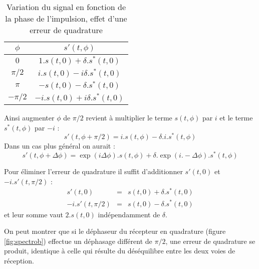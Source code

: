\begin{table}
\caption{Variation du signal en fonction de la phase de l'impulsion, 
effet d'une erreur de quadrature}
\label{tab:phaseb}
\begin{center}
\begin{tabular}[hbt]{cc}
\hline
$\phi$    &                      $s'(t,\phi)$           \\ \hline
$0$      &  $1.s(t,0)  + \delta.s^*(t,0)$ \\
$\pi/2$  &  $i.s(t,0) -i \delta.s^*(t,0)$ \\
$\pi$    &   $-s(t,0)  - \delta.s^*(t,0)$ \\
$-\pi/2$ & $-i.s(t,0) +i \delta.s^*(t,0)$ \\
\hline
\end{tabular}
\end{center}  
\end{table}


Ainsi augmenter $\phi$ de $\pi/2$ revient à multiplier le terme $s(t,\phi)$ par $i$ 
et le terme $s^*(t,\phi)$ par $-i$ : 
\begin{equation}
s'(t,\phi+\pi/2) = i . s(t,\phi) - \delta . i . s^*(t,\phi)
\end{equation}
Dans un cas plus général on aurait :
\begin{equation}
s'(t,\phi+\Delta \phi) = \exp(i \Delta \phi) . s(t,\phi) + 
\delta.\exp(i.-\Delta \phi) . s^*(t,\phi)
\end{equation}

Pour éliminer l'erreur de quadrature il suffit d'additionner 
$s'(t,0)$ et $-i . s'(t,\pi/2)$ :
\begin{eqnarray}
    s'(t,0)     & = & s(t,0) + \delta.s^*(t,0) \\
- i.s'(t,\pi/2) & = & s(t,0) - \delta.s^*(t,0)
\end{eqnarray}
et leur somme vaut $2.s(t,0)$ indépendamment de $\delta$.

On peut montrer que si le déphaseur du récepteur en quadrature (figure \ref{fig:spectrob})
effectue un déphasage différent de $\pi/2$, une erreur de quadrature se produit,
identique à celle qui résulte du déséquilibre entre les deux voies de réception.

